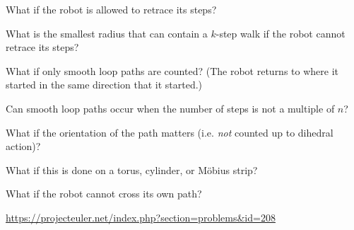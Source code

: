 \documentclass{article}
\begin{document}
\begin{related}
  \item What if the robot is allowed to retrace its steps?
  \item What is the smallest radius that can contain a $k$-step walk if the robot
    cannot retrace its steps?
  \item What if only smooth loop paths are counted?
    (The robot returns to where it started in the same direction that it
    started.)
  \item Can smooth loop paths occur when the number of steps is not a multiple
    of $n$?
  \item What if the orientation of the path matters (i.e. \textit{not} counted
    up to dihedral action)?
  \item What if this is done on a torus, cylinder, or M\"obius strip?
  \item What if the robot cannot cross its own path?
\end{related}
\begin{references}
  \item \url{https://projecteuler.net/index.php?section=problems&id=208}
\end{references}
\end{document}
